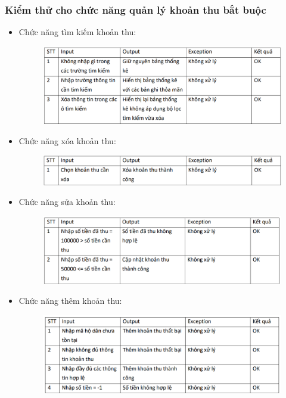 \documentclass{article}
\begin{document}
\subsubsection{Kiểm thử cho chức năng quản lý khoản thu bắt buộc}
\begin{itemize}
    \item Chức năng tìm kiếm khoản thu:
    \begin{figure}[H]
        \centering
        \includegraphics[width=1\textwidth]{Kiểm thử/Kt tìm kiếm khoản thu.png}
    \end{figure}
    \item Chức năng xóa khoản thu:
    \begin{figure}[H]
        \centering
        \includegraphics[width=1\textwidth]{Kiểm thử/KT xóa khoản thu.png}
    \end{figure}
    \newpage
    \item Chức năng sửa khoản thu:
    \begin{figure}[H]
        \centering
        \includegraphics[width=1\textwidth]{Kiểm thử/KT sửa khoản thu.png}
    \end{figure}
    \item Chức năng thêm khoản thu:
    \begin{figure}[H]
        \centering
        \includegraphics[width=1\textwidth]{Kiểm thử/KT thêm khoản thu.png}

\end{figure}
\end{itemize}
\end{document}
